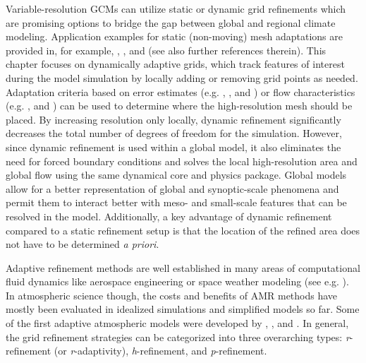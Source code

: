 Variable-resolution GCMs can utilize static or dynamic grid
refinements which are promising options to bridge the gap between global
and regional climate modeling.  Application examples for static (non-moving)
mesh adaptations are provided in, for example,
\cite{zarzycki2014using}, \cite{rauscher2014impact}, \cite{zarzycki2015tropical} and
\cite{huang:16} (see also further references therein).  This chapter
focuses on dynamically adaptive grids, which track features of interest
during the model simulation by locally adding or removing grid points as
needed.  Adaptation criteria based on error estimates (e.g.
\cite{skamarock1989adaptive},
\cite{behrens1998atmospheric}, and
\cite{blaise2012dynamic}) or flow characteristics (e.g.
\cite{hubbard2003three}, 
\cite{jablonowski2006AMR,jablonowski2009AMR} and
\cite{st2007comparison}) can be used to determine
where the high-resolution mesh should be placed.  By increasing
resolution only locally, dynamic refinement significantly decreases the
total number of degrees of freedom for the simulation.  However, since
dynamic refinement is used within a global model, it also eliminates the
need for forced boundary conditions and solves the local high-resolution
area and global flow using the same dynamical core and physics package.
Global models allow for a better representation of global and
synoptic-scale phenomena and permit them to interact better with meso-
and small-scale features that can be resolved in the model.
Additionally, a key advantage of dynamic refinement compared to a static
refinement setup is that the location of the refined area does not have
to be determined \emph{a priori}.  

Adaptive refinement methods are
well established in many areas of computational fluid dynamics like aerospace engineering or 
space weather modeling (see e.g. \cite{toth2012adaptive}). In atmospheric science though, the
costs and benefits of AMR methods have mostly been
evaluated in idealized simulations and simplified models so far.  
Some of the first adaptive atmospheric models were developed by
\cite{skamarock1989adaptive},
\cite{skamarock1993adaptive}, and
\cite{Dietachmayer:1992sj}.  In general, the grid refinement strategies can be
categorized into three overarching types:  \emph{r}-refinement (or \emph{r}-adaptivity),
\emph{h}-refinement, and \emph{p}-refinement.


